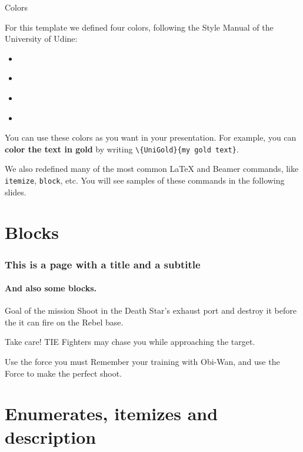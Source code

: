 \documentclass[usenames,dvipsnames]{beamer}
\begin{document}
\begin{frame}{Colors}

For this template we defined four colors, following the Style Manual of the University of Udine:
\begin{itemize}
\item \textcolor{white}{}
\item \textcolor{white}{}
\item \textcolor{white}{}
\item \textcolor{white}{}
\end{itemize}

\vskip 0.5cm

You can use these colors as you want in your presentation. For example, you can \textbf{\textcolor{UniGold}{color the text in gold}} by writing \texttt{\textbackslash\{UniGold\}\{my gold text\}}.

\vskip 0.5cm

We also redefined many of the most common \LaTeX{} and Beamer commands, like \texttt{itemize}, \texttt{block}, etc. You will see samples of these commands in the following slides.

\end{frame}

\section{Blocks}

\begin{frame}
\frametitle{This is a page with a title and a subtitle}
\framesubtitle{And also some blocks.}
\begin{block}{Goal of the mission}
Shoot in the Death Star's exhaust port and destroy it before the it can fire on the Rebel base.
\end{block}
\begin{alertblock}{Take care!}
TIE Fighters may chase you while approaching the target.
\end{alertblock}
\begin{exampleblock}{Use the force you must}
Remember your training with Obi-Wan, and use the Force to make the perfect shoot.
\end{exampleblock}

\end{frame}

\section{Enumerates, itemizes and description}
\end{document}
